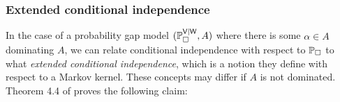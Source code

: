 




\subsubsection{Extended conditional independence}

In the case of a probability gap model $(\mathbb{P}_{\square}^{\mathsf{V}|\mathsf{W}},A)$ where there is some $\alpha\in A$ dominating $A$, we can relate conditional independence with respect to $\mathbb{P}_\square$ to what \citet{constantinou_extended_2017} \emph{extended conditional independence}, which is a notion they define with respect to a Markov kernel. These concepts may differ if $A$ is not dominated. Theorem 4.4 of \citet{constantinou_extended_2017} proves the following claim:

